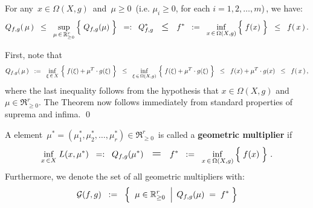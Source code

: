 \vskip 1.0cm
\begin{theorem}\label{WeakDuality}
\mbox{}
\vskip 0.1cm
\noindent
For any \,$x \in \Omega(X,g)$\, and \,$\mu \geq 0$\, (i.e. $\mu_{i} \geq 0$, for each $i =1,2,\ldots,m$)\,,
we have:
\begin{equation*}
Q_{f,g}\!\left(\,\mu\,\right)
\;\; \leq \;\;
	\underset{\mu\,\in\,\Re_{\geq 0}^{r}}{\sup}\left\{\;
		\overset{{\color{white}.}}{Q_{f,g}(\mu)}
		\;\right\}
\;\; =: \;\;
	Q_{f,g}^{*}
\quad\textnormal{\large$\leq$}\quad
	f^{*}
\;\; := \;\;
	\underset{x\,\in\,\Omega(X,g)}{\inf}\left\{\;
		\overset{{\color{white}.}}{f(x)}
		\;\right\}
\;\; \leq \;\;
	f(\,x\,)\,.
\end{equation*}
\end{theorem}
\proof
First, note that
\begin{equation*}
Q_{f,g}\!\left(\,\mu\,\right)
\;\; := \;\;
	\underset{\xi\,\in\,X}{\inf}\,\left\{\;f(\xi) \overset{{\color{white}.}}{+} \mu^{T}\cdot g(\xi)\;\right\}
\;\; \leq \;\;
	\underset{\xi\,\in\,\Omega(X,g)}{\inf}\,\left\{\;f(\xi) \overset{{\color{white}.}}{+} \mu^{T}\cdot g(\xi)\;\right\}
\;\; \leq \;\;
	f(x) \overset{{\color{white}.}}{+} \mu^{T}\cdot g(x)
\;\; \leq \;\;
	f(\,x\,)\,,
\end{equation*}
where the last inequality follows from the hypothesis that $x \in \Omega(X,g)$ and $\mu \in \Re_{\geq 0}^{r}$.
The Theorem now follows immediately from standard properties of suprema and infima.
\qed

\vskip 1.0cm
\begin{definition}
\mbox{}
\vskip 0.1cm
\noindent
A element
\,$\mu^{*} = (\mu_{1}^{*},\mu_{2}^{*},\ldots,\mu_{r}^{*}) \in \Re_{\geq 0}^{r}$\,
is called a \textbf{geometric multiplier} if
\begin{equation*}
	\underset{x\,\in X}{\inf}\;L(x,\mu^{*})
\;\; =: \;\;
	Q_{f,g}(\mu^{*})
\quad\textnormal{\Large$=$}\quad
	f^{*}
\;\; := \;\;
	\underset{x\,\in\,\Omega(X,g)}{\inf}\left\{\;
		\overset{{\color{white}.}}{f(x)}
		\;\right\}\,.
\end{equation*}
Furthermore, we denote the set of all geometric multipliers with:
\begin{equation*}
\mathcal{G}(f,g)
\;\; := \;\;
	\left\{\;\,
		\left.
		\overset{{\color{white}1}}{\mu} \in \Re_{\geq 0}^{r}
		\;\;\right\vert\;
			Q_{f,g}(\mu) \; = \; f^{*}
		\;\right\}
\end{equation*}
\end{definition}

